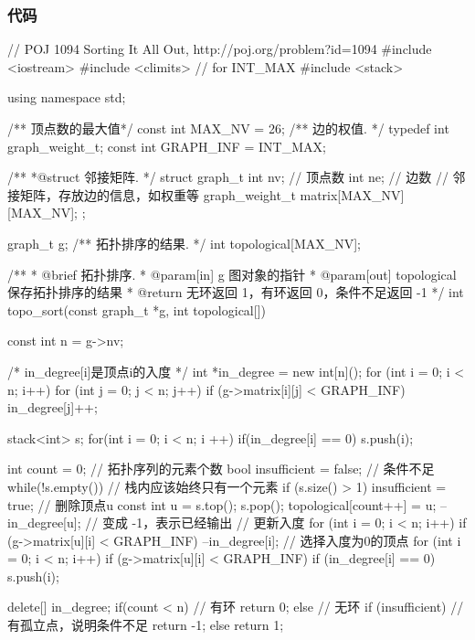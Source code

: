 \subsubsection{代码}
\begin{Codex}[label=poj_1094.cpp]
// POJ 1094 Sorting It All Out, http://poj.org/problem?id=1094
#include <iostream>
#include <climits>  // for INT_MAX
#include <stack>

using namespace std;

/** 顶点数的最大值*/
const int MAX_NV  = 26;
/** 边的权值. */
typedef int graph_weight_t;
const int GRAPH_INF = INT_MAX;

/**
 *@struct 邻接矩阵.
 */
struct graph_t {
    int nv; // 顶点数
    int ne; // 边数
    // 邻接矩阵，存放边的信息，如权重等
    graph_weight_t matrix[MAX_NV][MAX_NV];
};

graph_t g;
/** 拓扑排序的结果. */
int topological[MAX_NV];

/**
  * @brief 拓扑排序.
  * @param[in] g 图对象的指针
  * @param[out] topological 保存拓扑排序的结果
  * @return 无环返回 1，有环返回 0，条件不足返回 -1
  */
int topo_sort(const graph_t *g, int topological[]) {
    const int n = g->nv;

    /* in_degree[i]是顶点i的入度 */
    int *in_degree = new int[n]();
    for (int i = 0; i < n; i++) {
        for (int j = 0; j < n; j++) {
            if (g->matrix[i][j] < GRAPH_INF)
                in_degree[j]++;
        }
    }

    stack<int> s;
    for(int i = 0; i < n; i ++) {
        if(in_degree[i] == 0) {
            s.push(i);
        }
    }

    int count = 0; // 拓扑序列的元素个数
    bool insufficient = false;  // 条件不足
    while(!s.empty()) {
        // 栈内应该始终只有一个元素
        if (s.size() > 1) insufficient = true;
        // 删除顶点u
        const int u = s.top(); s.pop();
        topological[count++] = u;
        --in_degree[u];  // 变成 -1，表示已经输出
        // 更新入度
        for (int i = 0; i < n; i++) if (g->matrix[u][i] < GRAPH_INF) {
            --in_degree[i];
        }
        // 选择入度为0的顶点
        for (int i = 0; i < n; i++) if (g->matrix[u][i] < GRAPH_INF) {
            if (in_degree[i] == 0) s.push(i);
        }
    }

    delete[] in_degree;
    if(count < n) { // 有环
        return 0;
    } else { // 无环
        if (insufficient) {  // 有孤立点，说明条件不足
            return -1;
        } else {
            return 1;
        }
    }
}


\end{Codex}
